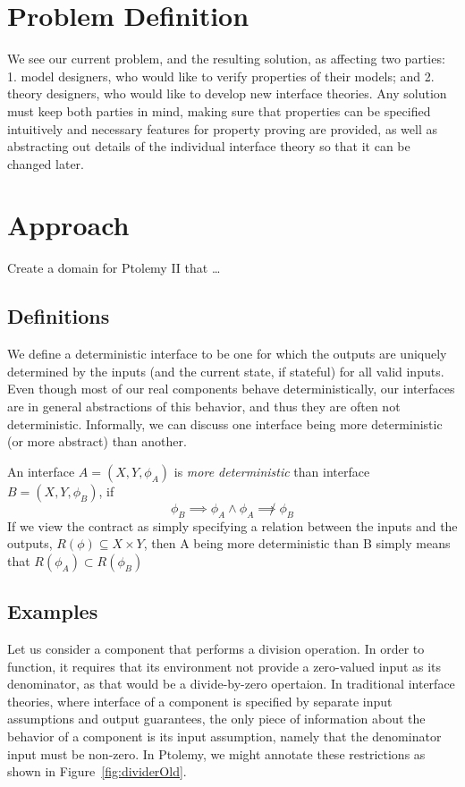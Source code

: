 \documentclass[preprint,11pt]{sigplanconf}
\begin{document}
\section{Problem Definition}
We see our current problem, and the resulting solution, as affecting two
parties:
1. model designers, who would like to verify properties of their models;
and
2. theory designers, who would like to develop new interface theories.
%
Any solution must keep both parties in mind, making sure that properties
can be specified intuitively and necessary features for property proving are
provided, as well as abstracting out details of the individual interface theory
so that it can be changed later.

\section{Approach}
Create a domain for Ptolemy II that \dots

\subsection{Definitions}
We define a deterministic interface to be one for which the outputs are
uniquely determined by the inputs (and the current state, if stateful) for all
valid inputs.
Even though most of our real components behave deterministically, our
interfaces are in general abstractions of this behavior, and thus they are
often not deterministic.
Informally, we can discuss one interface being more deterministic (or more
abstract) than another.

An interface $A=(X,Y,\phi_A)$ is \emph{more deterministic} than interface
$B=(X,Y,\phi_B)$, if
\[
\phi_B \implies \phi_A \wedge \phi_A \not\implies \phi_B
\]
If we view the contract as simply specifying a relation between the inputs and
the outputs, $R(\phi) \subseteq X \times Y$, then A being more deterministic
than B simply means that $R(\phi_A) \subset R(\phi_B)$


\subsection{Examples}
Let us consider a component that performs a division operation.  In order to
function, it requires that its environment not provide a zero-valued input as
its denominator, as that would be a divide-by-zero opertaion. In traditional
interface theories, where interface of a component is specified by separate
input assumptions and output guarantees, the only piece of information about
the behavior of a component is its input assumption, namely that the
denominator input must be non-zero. In Ptolemy, we might annotate these
restrictions as shown in Figure~\ref{fig:dividerOld}.
\end{document}
